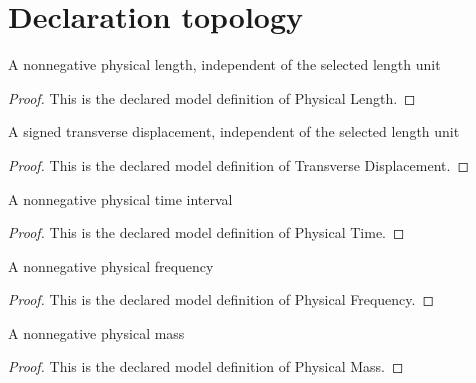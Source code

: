\section{Declaration topology}
\begin{definition}
  \label{def:physics:phyx-mini-0166:phyxminiproblems-problemphyxmini0166-physicallength}
  A nonnegative physical length, independent of the selected length unit
\end{definition}
\begin{proof}
  This is the declared model definition of Physical Length.
\end{proof}
\begin{definition}
  \label{def:physics:phyx-mini-0166:phyxminiproblems-problemphyxmini0166-transversedisplacement}
  A signed transverse displacement, independent of the selected length unit
\end{definition}
\begin{proof}
  This is the declared model definition of Transverse Displacement.
\end{proof}
\begin{definition}
  \label{def:physics:phyx-mini-0166:phyxminiproblems-problemphyxmini0166-physicaltime}
  A nonnegative physical time interval
\end{definition}
\begin{proof}
  This is the declared model definition of Physical Time.
\end{proof}
\begin{definition}
  \label{def:physics:phyx-mini-0166:phyxminiproblems-problemphyxmini0166-physicalfrequency}
  A nonnegative physical frequency
\end{definition}
\begin{proof}
  This is the declared model definition of Physical Frequency.
\end{proof}
\begin{definition}
  \label{def:physics:phyx-mini-0166:phyxminiproblems-problemphyxmini0166-physicalmass}
  A nonnegative physical mass
\end{definition}
\begin{proof}
  This is the declared model definition of Physical Mass.
\end{proof}
